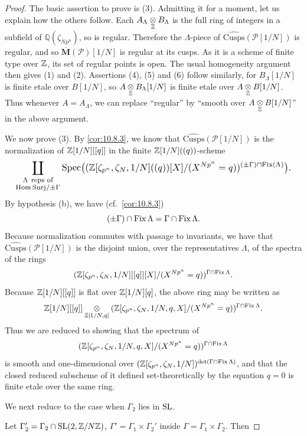 \begin{proof}
The basic assertion to prove is (3). Admitting it for a moment, let us explain how the others follow. Each $A_\Lambda \underset{\mathbb{Z}}{\otimes} B_\Lambda$ is the full ring of integers in a subfield of $\mathbb{Q}(\zeta_{Np^n})$, so is regular. Therefore the $\Lambda$-piece of $\widehat{\mathrm{Cusps}}(\mathcal{P}[1/N])$ is regular, and so $\overline{\mathbf{M}}(\mathcal{P})[1/N]$ is regular at its cusps. As it is a scheme of finite type over $\mathbb{Z}$, its set of regular points is open. The usual homogeneity argument then gives (1) and (2). Assertions (4), (5) and (6) follow similarly, for $B_\Lambda[1/N]$ is finite etale over $B[1/N]$, so $A \underset{\mathbb{Z}}{\otimes} B_\Lambda[1/N]$ is finite etale over $A \underset{\mathbb{Z}}{\otimes} B[1/N]$. Thus whenever $A = A_\Lambda$, we can replace ``regular'' by ``smooth over $A \underset{\mathbb{Z}}{\otimes} B[1/N]$'' in the above argument.
\par
We now prove (3). By \eqref{cor:10.8.3}, we know that $\widehat{\mathrm{Cusps}}(\mathcal{P}[1/N])$ is the normalization of $\mathbb{Z}[1/N][[q]]$ in the finite $\mathbb{Z}[1/N]((q))$-scheme
\[
\resizebox{0.97\linewidth}{!}{$\displaystyle
\coprod_{\substack{\Lambda\ \text{reps of}\\ \HomSurj/\pm\Gamma}} \Spec\bigl((\Z[\zeta_{p^n}, \zeta_N, 1/N]((q))[X]/(X^{Np^n} = q))^{(\pm\Gamma)\cap\Fix(\Lambda)}\bigr) .
$}
\]
By hypothesis (b), we have (cf.~\ref{cor:10.8.3})
\[
(\pm\Gamma)\cap\operatorname{Fix}\Lambda = \Gamma \cap \operatorname{Fix}\Lambda .
\]
Because normalization commutes with passage to invariants, we have that $\widehat{\mathrm{Cusps}}(\mathcal{P}[1/N])$ is the disjoint union, over the representatives $\Lambda$, of the spectra of the rings
\[
(\mathbb{Z}[\zeta_{p^n}, \zeta_N, 1/N][[q]][X]/(X^{Np^n} = q))^{\Gamma \cap \operatorname{Fix}\Lambda} .
\]
Because $\mathbb{Z}[1/N][[q]]$ is flat over $\mathbb{Z}[1/N][q]$, the above ring may be written as
\[
\mathbb{Z}[1/N][[q]] \underset{\mathbb{Z}[1/N, q]}{\otimes} (\mathbb{Z}[\zeta_{p^n}, \zeta_N, 1/N, q, X]/(X^{Np^n} = q))^{\Gamma \cap \operatorname{Fix}\Lambda} .
\]
Thus we are reduced to showing that the spectrum of
\[
(\mathbb{Z}[\zeta_{p^n}, \zeta_N, 1/N, q, X]/(X^{Np^n} = q))^{\Gamma \cap \operatorname{Fix}\Lambda}
\]
is smooth and one-dimensional over $(\mathbb{Z}[\zeta_{p^n}, \zeta_N, 1/N])^{\det(\Gamma \cap \operatorname{Fix}\Lambda)}$, and that the closed reduced subscheme of it defined set-theoretically by the equation $q = 0$ is finite etale over the same ring.
\par
We next reduce to the case when $\Gamma_2$ lies in $\operatorname{SL}$.
\par
Let $\Gamma_2' = \Gamma_2 \cap \operatorname{SL}(2, \mathbb{Z}/N\mathbb{Z})$, $\Gamma' = \Gamma_1 \times \Gamma_2'$ inside $\Gamma = \Gamma_1 \times \Gamma_2$. Then

\end{proof}
